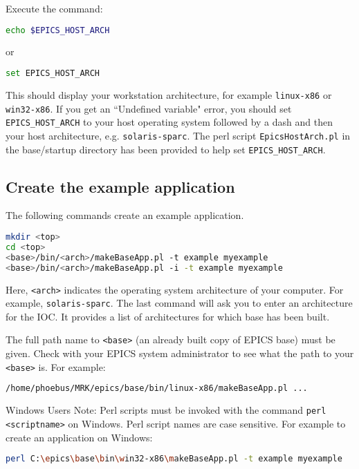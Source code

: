 Execute the command:

\begin{lstlisting}[language=sh,title=Unix/Linux]
echo $EPICS_HOST_ARCH
\end{lstlisting}
or
\begin{lstlisting}[language=sh,title=Windows]
set EPICS_HOST_ARCH
\end{lstlisting}

This should display your workstation architecture, for example \verb|linux-x86| or \verb|win32-x86|. If you get an ``Undefined 
variable" error, you should set \verb|EPICS_HOST_ARCH| to your host operating system followed by a dash and then your host 
architecture, e.g.  \verb|solaris-sparc|. The perl script \verb|EpicsHostArch.pl| in the base/startup directory has been provided to help 
set \verb|EPICS_HOST_ARCH|.

\subsection{Create the example application}

The following commands create an example application.

\begin{lstlisting}[language=sh]
mkdir <top>
cd <top>
<base>/bin/<arch>/makeBaseApp.pl -t example myexample
<base>/bin/<arch>/makeBaseApp.pl -i -t example myexample
\end{lstlisting}

Here, \verb|<arch>| indicates the operating system architecture of your computer.  For example, \verb|solaris-sparc|. The last command 
will ask you to enter an architecture for the IOC. It provides a list of architectures for which base has been built.

The full path name to \verb|<base>| (an already built copy of EPICS base) must be given. Check with your EPICS system 
administrator to see what the path to your \verb|<base>| is. For example:

\begin{lstlisting}[language=sh]
/home/phoebus/MRK/epics/base/bin/linux-x86/makeBaseApp.pl ...
\end{lstlisting}

Windows Users Note: Perl scripts must be invoked with the command \verb|perl <scriptname>| on Windows. Perl script names are 
case sensitive. For example to create an application on Windows:

\begin{lstlisting}[language=sh]
perl C:\epics\base\bin\win32-x86\makeBaseApp.pl -t example myexample
\end{lstlisting}

